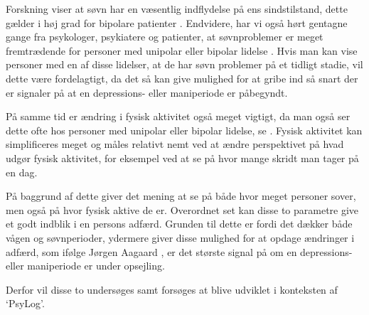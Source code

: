 Forskning viser at søvn har en væsentlig indflydelse på ens sindstilstand, dette gælder i høj grad for bipolare patienter \citep{CPSP:CPSP1164}.
Endvidere, har vi også hørt gentagne gange fra psykologer, psykiatere og patienter, at søvnproblemer er meget fremtrædende for personer med unipolar eller bipolar lidelse \citep[Kapitel 2, Sektion 3,4,5]{misc:faellesrapp}.
Hvis man kan vise personer med en af disse lidelser, at de har søvn problemer på et tidligt stadie, vil dette være fordelagtigt, da det så kan give mulighed for at gribe ind så snart der er signaler på at en depressions- eller maniperiode er påbegyndt.

På samme tid er ændring i fysisk aktivitet også meget vigtigt, da man også ser dette ofte hos personer med unipolar eller bipolar lidelse, se \citep[Kapitel 1, Sektion 4]{misc:faellesrapp}. 
Fysisk aktivitet kan simplificeres meget og måles relativt nemt ved at ændre perspektivet på hvad udgør fysisk aktivitet, for eksempel ved at se på hvor mange skridt man tager på en dag.

På baggrund af dette giver det mening at se på både hvor meget personer sover, men også på hvor fysisk aktive de er.
Overordnet set kan disse to parametre give et godt indblik i en persons adfærd.
Grunden til dette er fordi det dækker både vågen og søvnperioder, ydermere giver disse mulighed for at opdage ændringer i adfærd, som ifølge Jørgen Aagaard \citep[Kapitel 1, Sektion 4]{misc:faellesrapp}, er det største signal på om en depressions- eller maniperiode er under opsejling. 

Derfor vil disse to undersøges samt forsøges at blive udviklet i konteksten af `PsyLog'.